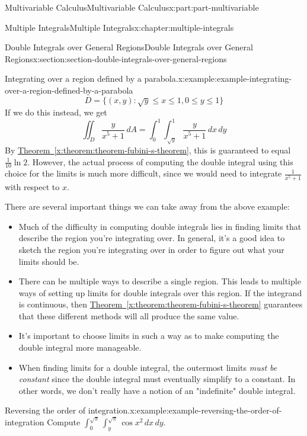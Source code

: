 \documentclass[twoside,10pt,]{tufte-book}
\newcommand{\xreffont}{\relax}
\numberwithin{equation}{part}
\begin{document}
\begin{partptx}{Multivariable Calculus}{}{Multivariable Calculus}{}{}{x:part:part-multivariable}
\begin{chapterptx}{Multiple Integrals}{}{Multiple Integrals}{}{}{x:chapter:multiple-integrals}
\begin{sectionptx}{Double Integrals over General Regions}{}{Double Integrals over General Regions}{}{}{x:section:section-double-integrals-over-general-regions}
\begin{example}{Integrating over a region defined by a parabola.}{x:example:example-integrating-over-a-region-defined-by-a-parabola}
\begin{equation*}
D = \{(x,y) : \sqrt{y} \leq x\leq 1, 0\leq y\leq 1\}
\end{equation*}
If we do this instead, we get%
\begin{equation*}
\iint_{D}\frac{y}{x^{5}+1}\,dA = \int_{0}^{1}\int_{\sqrt{y}}^{1}\frac{y}{x^{5}+1}\,dx\,dy 
\end{equation*}
By \hyperref[x:theorem:theorem-fubini-s-theorem]{Theorem~{\xreffont\ref{x:theorem:theorem-fubini-s-theorem}}}, this is guaranteed to equal \(\frac{1}{10}\ln2\). However, the actual process of computing the double integral using this choice for the limits is much more difficult, since we would need to integrate \(\frac{1}{x^{5}+1}\) with respect to \(x\).%
\end{example}
There are several important things we can take away from the above example:%
\begin{itemize}[label=\textbullet]
\item{}Much of the difficulty in computing double integrals lies in finding limits that describe the region you're integrating over. In general, it's a good idea to sketch the region you're integrating over in order to figure out what your limits should be.%
\item{}There can be multiple ways to describe a single region. This leads to multiple ways of setting up limits for double integrals over this region. If the integrand is continuous, then \hyperref[x:theorem:theorem-fubini-s-theorem]{Theorem~{\xreffont\ref{x:theorem:theorem-fubini-s-theorem}}} guarantees that these different methods will all produce the same value.%
\item{}It's important to choose limits in such a way as to make computing the double integral more manageable.%
\item{}When finding limits for a double integral, the outermost limits \emph{must be constant} since the double integral must eventually simplify to a constant. In other words, we don't really have a notion of an "indefinite" double integral.%
\end{itemize}
%
\begin{example}{Reversing the order of integration.}{x:example:example-reversing-the-order-of-integration}%
Compute \(\int_{0}^{\sqrt{\pi}}\int_{y}^{\sqrt{\pi}}\cos x^{2}\,dx\,dy\).%
\par\smallskip%

\end{example}
\end{sectionptx}
\end{chapterptx}
\end{partptx}
\end{document}
